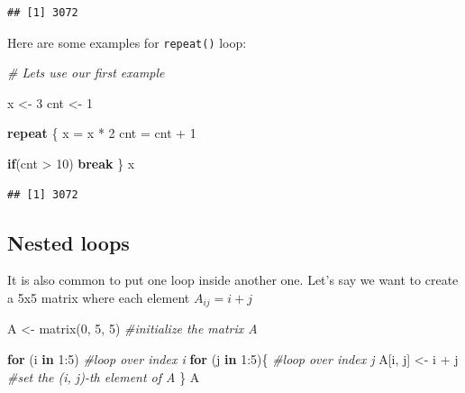 \documentclass[
]{book}
\newenvironment{Shaded}{\begin{snugshade}}{\end{snugshade}}
\newcommand{\CommentTok}[1]{\textcolor[rgb]{0.56,0.35,0.01}{\textit{#1}}}
\newcommand{\ControlFlowTok}[1]{\textcolor[rgb]{0.13,0.29,0.53}{\textbf{#1}}}
\newcommand{\DecValTok}[1]{\textcolor[rgb]{0.00,0.00,0.81}{#1}}
\newcommand{\FunctionTok}[1]{\textcolor[rgb]{0.00,0.00,0.00}{#1}}
\newcommand{\NormalTok}[1]{#1}
\newcommand{\OtherTok}[1]{\textcolor[rgb]{0.56,0.35,0.01}{#1}}
\newcommand{\SpecialCharTok}[1]{\textcolor[rgb]{0.00,0.00,0.00}{#1}}
\theoremstyle{definition}
\theoremstyle{definition}
\theoremstyle{definition}
\theoremstyle{definition}
\theoremstyle{remark}
\begin{document}
\begin{verbatim}
## [1] 3072
\end{verbatim}

Here are some examples for \texttt{repeat()} loop:

\begin{Shaded}
\begin{Highlighting}[]
\CommentTok{\# Let\textquotesingle{}s use our first example}

\NormalTok{x }\OtherTok{\textless{}{-}} \DecValTok{3}
\NormalTok{cnt }\OtherTok{\textless{}{-}} \DecValTok{1}

\ControlFlowTok{repeat}\NormalTok{ \{}
\NormalTok{   x }\OtherTok{=}\NormalTok{ x }\SpecialCharTok{*} \DecValTok{2}
\NormalTok{   cnt }\OtherTok{=}\NormalTok{ cnt }\SpecialCharTok{+} \DecValTok{1}
  
   \ControlFlowTok{if}\NormalTok{(cnt }\SpecialCharTok{\textgreater{}} \DecValTok{10}\NormalTok{) }\ControlFlowTok{break}
\NormalTok{\}}
\NormalTok{x}
\end{Highlighting}
\end{Shaded}

\begin{verbatim}
## [1] 3072
\end{verbatim}

\hypertarget{nested-loops}{%
\subsection{Nested loops}\label{nested-loops}}

It is also common to put one loop inside another one. Let's say we want to create a 5x5 matrix where each element \(A_{i j}=i+j\)

\begin{Shaded}
\begin{Highlighting}[]
\NormalTok{A }\OtherTok{\textless{}{-}} \FunctionTok{matrix}\NormalTok{(}\DecValTok{0}\NormalTok{, }\DecValTok{5}\NormalTok{, }\DecValTok{5}\NormalTok{) }\CommentTok{\#initialize the matrix A}

\ControlFlowTok{for}\NormalTok{ (i }\ControlFlowTok{in} \DecValTok{1}\SpecialCharTok{:}\DecValTok{5}\NormalTok{)       }\CommentTok{\#loop over index i}
  \ControlFlowTok{for}\NormalTok{ (j }\ControlFlowTok{in} \DecValTok{1}\SpecialCharTok{:}\DecValTok{5}\NormalTok{)\{    }\CommentTok{\#loop over index j}
\NormalTok{    A[i, j] }\OtherTok{\textless{}{-}}\NormalTok{ i }\SpecialCharTok{+}\NormalTok{ j }\CommentTok{\#set the (i, j){-}th element of A}
\NormalTok{  \}}
\NormalTok{A}
\end{Highlighting}
\end{Shaded}
\end{document}
